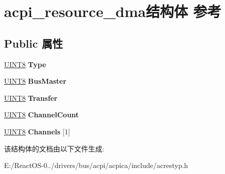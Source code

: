 \hypertarget{structacpi__resource__dma}{}\section{acpi\+\_\+resource\+\_\+dma结构体 参考}
\label{structacpi__resource__dma}
\subsection*{Public 属性}
\begin{DoxyCompactItemize}
\item 
\mbox{\label{structacpi__resource__dma_a576bfe6586ebb495048ca306bcf08881}} 
\hyperlink{_processor_bind_8h_ab27e9918b538ce9d8ca692479b375b6a}{U\+I\+N\+T8} {\bfseries Type}
\item 
\mbox{\label{structacpi__resource__dma_aacbfe50efe953b0694db2f40a704bd37}} 
\hyperlink{_processor_bind_8h_ab27e9918b538ce9d8ca692479b375b6a}{U\+I\+N\+T8} {\bfseries Bus\+Master}
\item 
\mbox{\label{structacpi__resource__dma_a52be5a48c065de04cdd5ca35677fb6de}} 
\hyperlink{_processor_bind_8h_ab27e9918b538ce9d8ca692479b375b6a}{U\+I\+N\+T8} {\bfseries Transfer}
\item 
\mbox{\label{structacpi__resource__dma_a7f62291b22e0219fb777f58800a755ad}} 
\hyperlink{_processor_bind_8h_ab27e9918b538ce9d8ca692479b375b6a}{U\+I\+N\+T8} {\bfseries Channel\+Count}
\item 
\mbox{\label{structacpi__resource__dma_a290217ad4bd120a9d465adbbff7f8370}} 
\hyperlink{_processor_bind_8h_ab27e9918b538ce9d8ca692479b375b6a}{U\+I\+N\+T8} {\bfseries Channels} \mbox{[}1\mbox{]}
\end{DoxyCompactItemize}


该结构体的文档由以下文件生成\+:\begin{DoxyCompactItemize}
\item 
E\+:/\+React\+O\+S-\/0../drivers/bus/acpi/acpica/include/acrestyp.\+h\end{DoxyCompactItemize}
